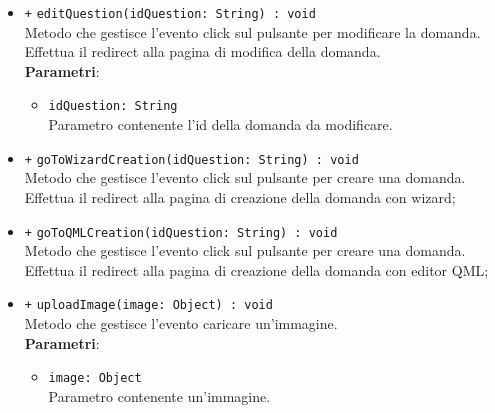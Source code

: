\begin{itemize}
\begin{itemize}
		\item \texttt{+} \texttt{editQuestion(idQuestion: String) : void} \\ 
		Metodo che gestisce l'evento click sul pulsante per modificare la domanda. Effettua il redirect alla pagina di modifica della domanda. \\
		\textbf{Parametri}:
		\begin{itemize}
			\item \texttt{idQuestion: String} \\
			Parametro contenente l'id della domanda da modificare.
		\end{itemize}
				
		\item \texttt{+} \texttt{goToWizardCreation(idQuestion: String) : void} \\ 
		Metodo che gestisce l'evento click sul pulsante per creare una domanda. Effettua il redirect alla pagina di creazione della domanda con wizard; \\
		\item \texttt{+} \texttt{goToQMLCreation(idQuestion: String) : void} \\ 
		Metodo che gestisce l'evento click sul pulsante per creare una domanda. Effettua il redirect alla pagina di creazione della domanda con editor QML;\\
		\item \texttt{+} \texttt{uploadImage(image: Object) : void} \\ 
		Metodo che gestisce l'evento caricare un'immagine. \\
		\textbf{Parametri}:
		\begin{itemize}
			\item \texttt{image: Object} \\
			Parametro contenente un'immagine.
		\end{itemize}
	\end{itemize}
\end{itemize}

